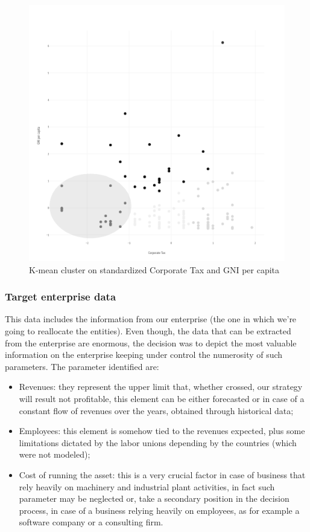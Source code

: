\begin{doublespace}
\begin{figure}
\centering
\includegraphics[width=1\linewidth]{Images/Cluster-GNI-CT.png}
\caption{K-mean cluster on standardized Corporate Tax and GNI per capita}
\end{figure}

\subsubsection{Target enterprise data}

This data includes the information from our enterprise (the one in which we're going to reallocate the entities). Even though, the data that can be extracted from the enterprise are enormous, the decision was to depict the most valuable information on the enterprise keeping under control the numerosity of such parameters. The parameter identified are: 
\begin{itemize}
	\item Revenues: they represent the upper limit that, whether crossed, our strategy will result not profitable, this element can be either forecasted or in case of a constant flow of revenues over the years, obtained through historical data;
	\item Employees: this element is somehow tied to the revenues expected, plus some limitations dictated by the labor unions depending by the countries (which were not modeled);
	\item Cost of running the asset: this is a very crucial factor in case of business that rely heavily on machinery and industrial plant activities, in fact such parameter may be neglected or, take a secondary position in the decision process, in case of a business relying heavily on employees, as for example a software company or a consulting firm.
\end{itemize}


\end{doublespace}
